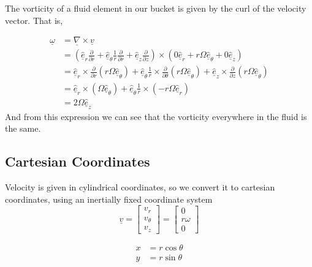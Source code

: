 The vorticity of a fluid element in our bucket is given by the curl of the velocity vector.
That is,

\begin{equation*}
  \begin{split}
    \underline{\omega}&=\underline{\nabla}\times\underline{v} \\
    &=\left(\hat{\underline{e}}_{r}\frac{\partial}{\partial{}r}+\hat{\underline{e}}_{\theta}\frac{1}{r}\frac{\partial}{\partial{}r}+\hat{\underline{e}}_{z}\frac{\partial}{\partial{}z}\right)\times\left(0\hat{\underline{e}}_{r}+r\Omega\hat{\underline{e}}_{\theta}+0\hat{\underline{e}}_{z}\right) \\
    &=\hat{\underline{e}}_{r}\times\frac{\partial}{\partial{}r}(r\Omega\hat{\underline{e}}_{\theta})+
    \hat{\underline{e}}_{\theta}\frac{1}{r}\times\frac{\partial}{\partial\theta}(r\Omega\hat{\underline{e}}_{\theta})+
    \hat{\underline{e}}_{z}\times\frac{\partial}{\partial{}z}(r\Omega\hat{\underline{e}}_{\theta}) \\
    &=\hat{\underline{e}}_{r}\times(\Omega\hat{\underline{e}}_{\theta})+\hat{\underline{e}}_{\theta}\frac{1}{r}\times(-r\Omega\hat{\underline{e}}_{r}) \\
    &=2\Omega\hat{\underline{e}}_{z}
  \end{split}
\end{equation*}
And from this expression we can see that the vorticity everywhere in the fluid is the same.

\subsection{Cartesian Coordinates}
Velocity is given in cylindrical coordinates, so we convert it to cartesian coordinates, using an inertially fixed coordinate system
\begin{equation*}
  \underline{v}=
  \begin{bmatrix}
    v_{r} \\
    v_{\theta} \\
    v_{z}
  \end{bmatrix}=
  \begin{bmatrix}
    0 \\
    r\omega \\
    0
  \end{bmatrix}
\end{equation*}

\begin{equation*}
  \begin{split}
    x&=r\cos{\theta} \\
    y&=r\sin{\theta}
  \end{split}
\end{equation*}

